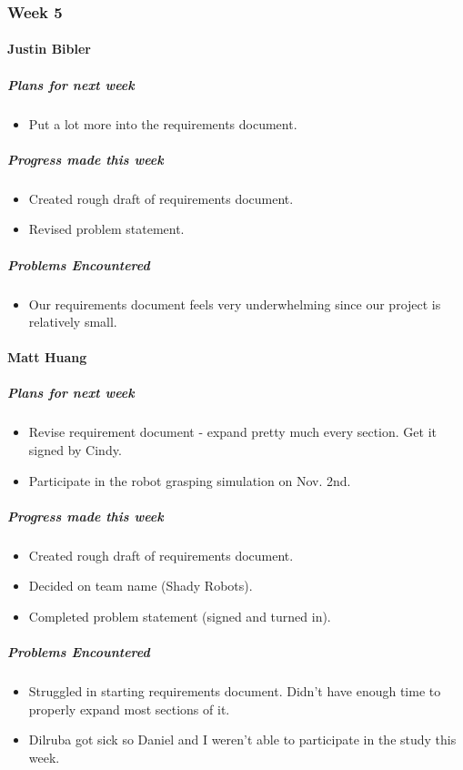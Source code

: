 {
\subsubsection{Week 5}
\paragraph{Justin Bibler}
\subparagraph{Plans for next week}
\begin{itemize}
  \item Put a lot more into the requirements document.
\end{itemize}

\subparagraph{Progress made this week}
\begin{itemize}
  \item Created rough draft of requirements document.
  \item Revised problem statement.
\end{itemize}

\subparagraph{Problems Encountered}
\begin{itemize}
  \item Our requirements document feels very underwhelming since our project is relatively small.
\end{itemize}

\vspace{3mm}

\paragraph{Matt Huang}
\subparagraph{Plans for next week}
\begin{itemize}
  \item Revise requirement document - expand pretty much every section. Get it signed by Cindy.
  \item Participate in the robot grasping simulation on Nov. 2nd.
\end{itemize}

\subparagraph{Progress made this week}
\begin{itemize}
  \item Created rough draft of requirements document.
  \item Decided on team name (Shady Robots).
  \item Completed problem statement (signed and turned in).
\end{itemize}

\subparagraph{Problems Encountered}
\begin{itemize}
  \item Struggled in starting requirements document. Didn't have enough time to properly expand most sections of it.
  \item Dilruba got sick so Daniel and I weren't able to participate in the study this week.
\end{itemize}

}
